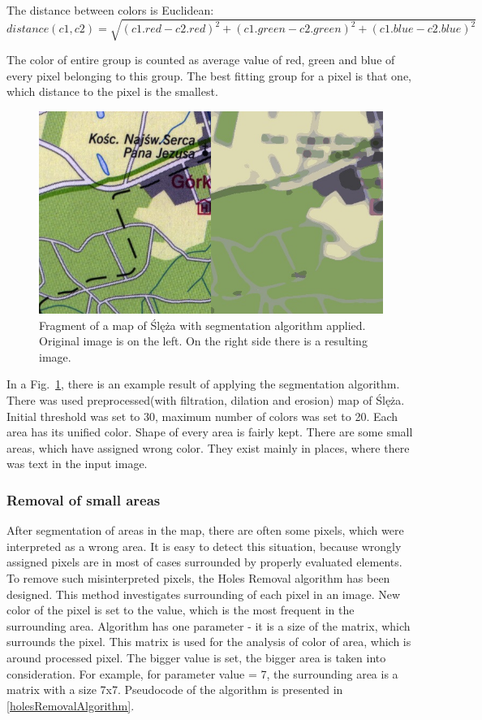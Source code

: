 \documentclass[a4paper,onecolumn,oneside,12pt]{memoir}
\begin{document}
The distance between colors is Euclidean:~
$$
distance(c1, c2) = \sqrt{(c1.red - c2.red)^2 + (c1.green - c2.green)^2 + (c1.blue - c2.blue)^2}
$$

The color of entire group is counted as average value of red, green and blue of every pixel
belonging to this group. The best fitting group for a pixel is that one, which distance to the pixel
is the smallest.

\begin{figure}[!ht]
\begin{center}
\includegraphics[scale=2.5]{images/segmentationResult.png}
\caption{Fragment of a map of Ślęża with segmentation algorithm applied.
Original image is on the left. On the right side there is a resulting image.}
\label{segmentationResult}
\end{center}
\end{figure}

In a Fig.~\ref{segmentationResult}, there is an example result of applying the segmentation
algorithm. There was used preprocessed(with filtration, dilation and erosion) map of Ślęża. Initial
threshold was set to 30, maximum number of colors was set to 20. Each area has its unified color.
Shape of every area is fairly kept. There are some small areas, which have assigned wrong color.
They exist mainly in places, where there was text in the input image.

\subsubsection{Removal of small areas}

After segmentation of areas in the map, there are often some pixels, which were interpreted as a
wrong area. It is easy to detect this situation, because wrongly assigned pixels are in most of
cases surrounded by properly evaluated elements. To remove such misinterpreted pixels, the Holes
Removal algorithm has been designed. This method investigates surrounding of each pixel in an image.
New color of the pixel is set to the value, which is the most frequent in the surrounding area.
Algorithm has one parameter - it is a size of the matrix, which surrounds the pixel. This matrix is
used for the analysis of color of area, which is around processed pixel. The bigger value is set,
the bigger area is taken into consideration. For example, for parameter value = 7, the surrounding
area is a matrix with a size 7x7. Pseudocode of the algorithm is presented in
\ref{holesRemovalAlgorithm}.
\end{document}
